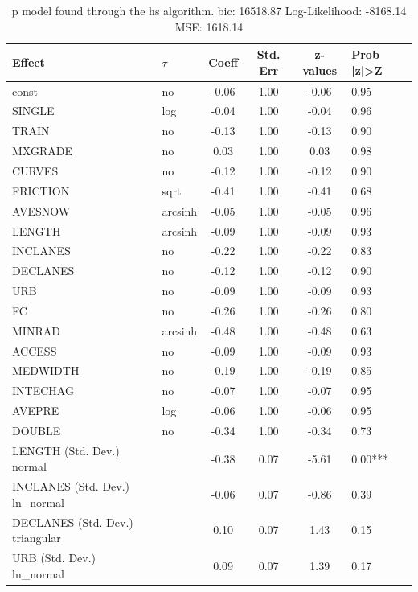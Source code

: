 \begin{table}
	\caption{p model found through the hs algorithm. bic: 16518.87 Log-Likelihood: -8168.14 MSE: 1618.14}
	\begin{center}
		\begin{tabular}{|l|l|c|c|c|l|}
			\hline
			Effect & $\tau$ & Coeff & Std. Err & z-values & Prob |z|>Z \\
			\hline
			const & no & -0.06 & 1.00 & -0.06 & 0.95 \\
			\hline
			SINGLE & log & -0.04 & 1.00 & -0.04 & 0.96 \\
			\hline
			TRAIN & no & -0.13 & 1.00 & -0.13 & 0.90 \\
			\hline
			MXGRADE & no & 0.03 & 1.00 & 0.03 & 0.98 \\
			\hline
			CURVES & no & -0.12 & 1.00 & -0.12 & 0.90 \\
			\hline
			FRICTION & sqrt & -0.41 & 1.00 & -0.41 & 0.68 \\
			\hline
			AVESNOW & arcsinh & -0.05 & 1.00 & -0.05 & 0.96 \\
			\hline
			LENGTH & arcsinh & -0.09 & 1.00 & -0.09 & 0.93 \\
			\hline
			INCLANES & no & -0.22 & 1.00 & -0.22 & 0.83 \\
			\hline
			DECLANES & no & -0.12 & 1.00 & -0.12 & 0.90 \\
			\hline
			URB & no & -0.09 & 1.00 & -0.09 & 0.93 \\
			\hline
			FC & no & -0.26 & 1.00 & -0.26 & 0.80 \\
			\hline
			MINRAD & arcsinh & -0.48 & 1.00 & -0.48 & 0.63 \\
			\hline
			ACCESS & no & -0.09 & 1.00 & -0.09 & 0.93 \\
			\hline
			MEDWIDTH & no & -0.19 & 1.00 & -0.19 & 0.85 \\
			\hline
			INTECHAG & no & -0.07 & 1.00 & -0.07 & 0.95 \\
			\hline
			AVEPRE & log & -0.06 & 1.00 & -0.06 & 0.95 \\
			\hline
			DOUBLE & no & -0.34 & 1.00 & -0.34 & 0.73 \\
			\hline
			LENGTH (Std. Dev.) normal &  & -0.38 & 0.07 & -5.61 & 0.00*** \\
			\hline
			INCLANES (Std. Dev.) ln_normal &  & -0.06 & 0.07 & -0.86 & 0.39 \\
			\hline
			DECLANES (Std. Dev.) triangular &  & 0.10 & 0.07 & 1.43 & 0.15 \\
			\hline
			URB (Std. Dev.) ln_normal &  & 0.09 & 0.07 & 1.39 & 0.17 \\

\end{tabular}
\end{center}
\end{table}
